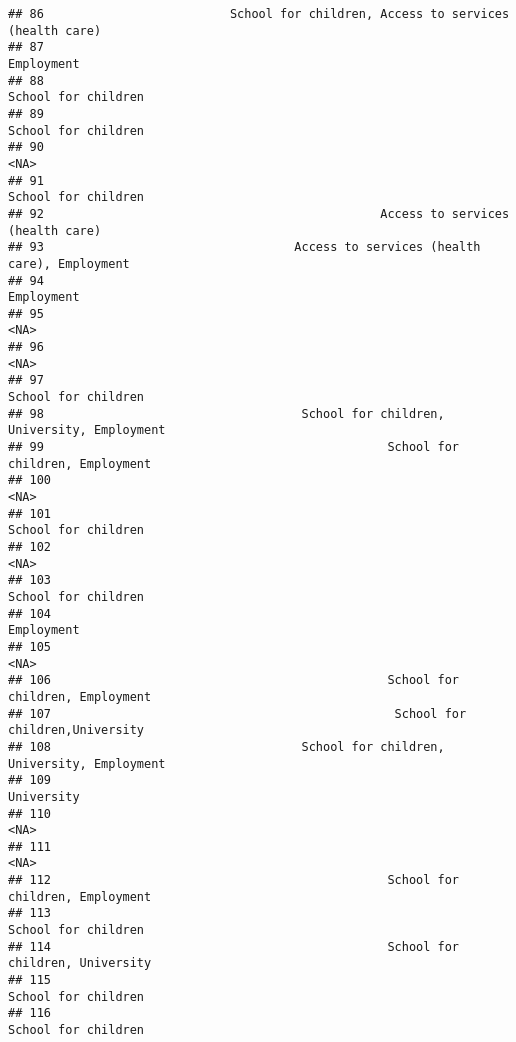 \documentclass[
]{article}
\begin{document}
\begin{verbatim}
## 86                          School for children, Access to services (health care)
## 87                                                                     Employment
## 88                                                            School for children
## 89                                                            School for children
## 90                                                                           <NA>
## 91                                                            School for children
## 92                                               Access to services (health care)
## 93                                   Access to services (health care), Employment
## 94                                                                     Employment
## 95                                                                           <NA>
## 96                                                                           <NA>
## 97                                                            School for children
## 98                                    School for children, University, Employment
## 99                                                School for children, Employment
## 100                                                                          <NA>
## 101                                                           School for children
## 102                                                                          <NA>
## 103                                                           School for children
## 104                                                                    Employment
## 105                                                                          <NA>
## 106                                               School for children, Employment
## 107                                                School for children,University
## 108                                   School for children, University, Employment
## 109                                                                    University
## 110                                                                          <NA>
## 111                                                                          <NA>
## 112                                               School for children, Employment
## 113                                                           School for children
## 114                                               School for children, University
## 115                                                           School for children
## 116                                                           School for children

\end{verbatim}
\end{document}
